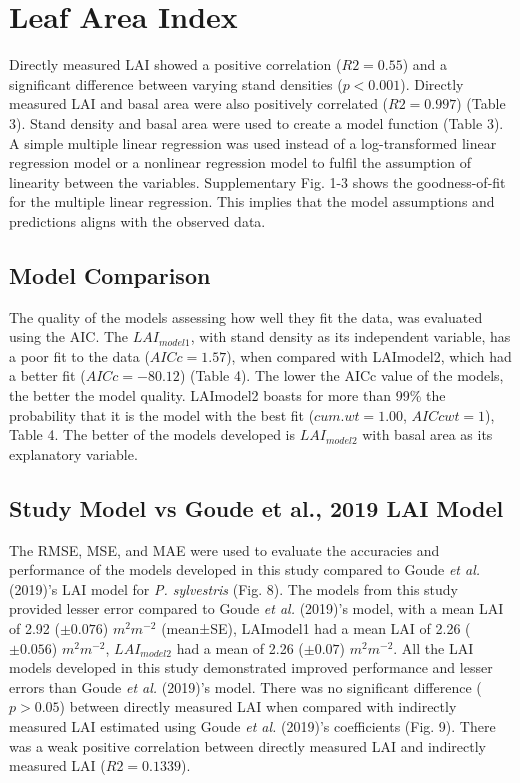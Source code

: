 \documentclass[11pt, a4paper]{report}
\begin{document}
\section{Leaf Area Index}
Directly measured LAI showed a positive correlation ($R2 = 0.55$) and a significant difference between varying stand densities ($p<0.001$). Directly measured LAI and basal area were also positively correlated ($R2 = 0.997$) (Table 3). Stand density and basal area were used to create a model function (Table 3). A simple multiple linear regression was used instead of a log-transformed linear regression model or a nonlinear regression model to fulfil the assumption of linearity between the variables. Supplementary Fig. 1-3 shows the goodness-of-fit for the multiple linear regression. This implies that the model assumptions and predictions aligns with the observed data.
\subsection{Model Comparison}
The quality of the models assessing how well they fit the data, was evaluated using the AIC. The $LAI_{model1}$, with stand density as its independent variable, has a poor fit to the data ($AICc = 1.57$), when compared with LAImodel2, which had a better fit ($AICc = -80.12$) (Table 4). The lower the AICc value of the models, the better the model quality. LAImodel2 boasts for more than 99\% the probability that it is the model with the best fit ($cum.wt = 1.00$, $AICcwt = 1$), Table 4. The better of the models developed is $LAI_{model2}$ with basal area as its explanatory variable.
\subsection{Study Model vs Goude et al., 2019 LAI Model}
The RMSE, MSE, and MAE were used to evaluate the accuracies and performance of the models developed in this study compared to Goude \textit{et al.} (2019)’s LAI model for \textit{P. sylvestris} (Fig. 8). The models from this study provided lesser error compared to Goude \textit{et al.} (2019)’s model, with a mean LAI of 2.92 ($±0.076$) $m^{2}m^{-2}$ (mean±SE), LAImodel1 had a mean LAI of 2.26 ($±0.056$) $m^2m^{-2}$, $LAI_{model2}$ had a mean of 2.26 ($±0.07$) $m^2m^{-2}$. All the LAI models developed in this study demonstrated improved performance and lesser errors than Goude \textit{et al.} (2019)’s model. There was no significant difference ($p > 0.05$) between directly measured LAI when compared with indirectly measured LAI estimated using Goude \textit{et al.} (2019)’s coefficients (Fig. 9). There was a weak positive correlation between directly measured LAI and indirectly measured LAI ($R2 = 0.1339$).
\end{document}
